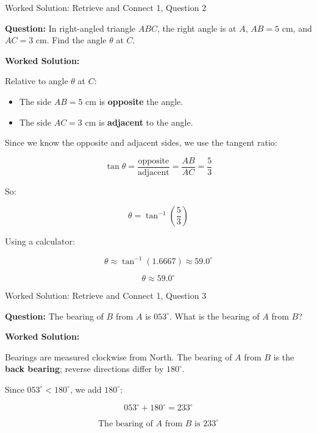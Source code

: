 \documentclass[aspectratio=169,11pt]{beamer}
\begin{document}
\begin{frame}{Worked Solution: Retrieve and Connect 1, Question 2}

\textbf{Question:} In right-angled triangle \(ABC\), the right angle is at \(A\), \(AB = 5\text{ cm}\), and \(AC = 3\text{ cm}\). Find the angle \(\theta\) at \(C\).

\textbf{Worked Solution:}

Relative to angle \(\theta\) at \(C\):
\begin{itemize}
\item The side \(AB = 5\text{ cm}\) is \textbf{opposite} the angle.
\item The side \(AC = 3\text{ cm}\) is \textbf{adjacent} to the angle.
\end{itemize}

Since we know the opposite and adjacent sides, we use the tangent ratio:

\[
\tan\theta = \frac{\text{opposite}}{\text{adjacent}} = \frac{AB}{AC} = \frac{5}{3}
\]

So:

\[
\theta = \tan^{-1}\left(\frac{5}{3}\right)
\]

Using a calculator:

\[
\theta \approx \tan^{-1}(1.6667) \approx 59.0^\circ
\]

\[
\boxed{\theta \approx 59.0^\circ}
\]

\end{frame}

\begin{frame}{Worked Solution: Retrieve and Connect 1, Question 3}

\textbf{Question:} The bearing of \(B\) from \(A\) is \(053^\circ\). What is the bearing of \(A\) from \(B\)?

\textbf{Worked Solution:}

Bearings are measured clockwise from North. The bearing of \(A\) from \(B\) is the \textbf{back bearing}; reverse directions differ by \(180^\circ\).

Since \(053^\circ < 180^\circ\), we add \(180^\circ\):

\[
053^\circ + 180^\circ = 233^\circ
\]

\[
\boxed{\text{The bearing of } A \text{ from } B \text{ is } 233^\circ}
\]

\end{frame}
\end{document}
